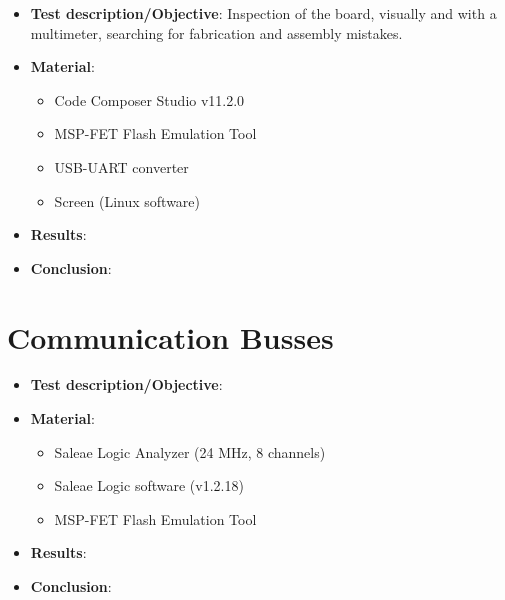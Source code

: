 \begin{itemize}
    \item \textbf{Test description/Objective}: Inspection of the board, visually and with a multimeter, searching for fabrication and assembly mistakes.
    \item \textbf{Material}:
        \begin{itemize}
            \item Code Composer Studio v11.2.0
            \item MSP-FET Flash Emulation Tool
            \item USB-UART converter
            \item Screen (Linux software)
        \end{itemize}
    \item \textbf{Results}: %
    \item \textbf{Conclusion}: %
\end{itemize}


\section{Communication Busses}

\begin{itemize}
    \item \textbf{Test description/Objective}: %
    \item \textbf{Material}:
        \begin{itemize}
            \item Saleae Logic Analyzer (24 MHz, 8 channels)
            \item Saleae Logic software (v1.2.18)
            \item MSP-FET Flash Emulation Tool
        \end{itemize}
    \item \textbf{Results}: %
    \item \textbf{Conclusion}: %
\end{itemize}

